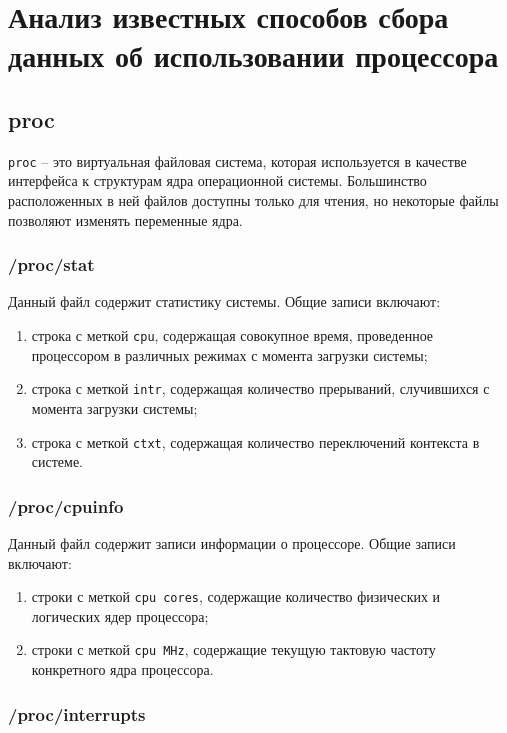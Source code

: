 \section{Анализ известных способов сбора данных об использовании процессора}

\subsection{proc}

\texttt{proc} -- это виртуальная файловая система, которая используется в качестве интерфейса к структурам ядра операционной системы. Большинство расположенных в ней файлов доступны только для чтения, но некоторые файлы позволяют изменять переменные ядра. 

\newpage

\subsubsection{/proc/stat}

Данный файл содержит статистику системы. Общие записи включают: 
\begin{enumerate}
	\item строка с меткой \texttt{cpu}, содержащая совокупное время, проведенное процессором в различных режимах с момента загрузки системы;
	\item строка с меткой \texttt{intr}, содержащая количество прерываний, случившихся с момента загрузки системы;
	\item строка с меткой \texttt{ctxt}, содержащая количество переключений контекста в системе.
\end{enumerate}

\subsubsection{/proc/cpuinfo}

Данный файл содержит записи информации о процессоре. Общие записи включают:
\begin{enumerate}
	\item строки с меткой \texttt{cpu cores}, содержащие количество физических и логических ядер процессора;
	\item строки с меткой \texttt{cpu MHz}, содержащие текущую тактовую частоту конкретного ядра процессора.
\end{enumerate}

\subsubsection{/proc/interrupts}

